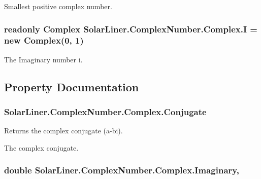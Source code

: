 Smallest positive complex number. 

\subsubsection[{\texorpdfstring{I}{I}}]{\setlength{\rightskip}{0pt plus 5cm}readonly {\bf Complex} Solar\+Liner.\+Complex\+Number.\+Complex.\+I = new {\bf Complex}(0, 1)\hspace{0.3cm}{\ttfamily [static]}}\hypertarget{struct_solar_liner_1_1_complex_number_1_1_complex_acc1fad2ea19dcd2fae4cd17279edb99d}{}\label{struct_solar_liner_1_1_complex_number_1_1_complex_acc1fad2ea19dcd2fae4cd17279edb99d}


The Imaginary number i. 



\subsection{Property Documentation}
\subsubsection[{\texorpdfstring{Conjugate}{Conjugate}}]{ Solar\+Liner.\+Complex\+Number.\+Complex.\+Conjugate\hspace{0.3cm}{\ttfamily [get]}}\hypertarget{struct_solar_liner_1_1_complex_number_1_1_complex_a17a3e752294b9155259c017f85dc029c}{}\label{struct_solar_liner_1_1_complex_number_1_1_complex_a17a3e752294b9155259c017f85dc029c}


Returns the complex conjugate (a-\/bi). 

The complex conjugate.
\subsubsection[{\texorpdfstring{Imaginary}{Imaginary}}]{\setlength{\rightskip}{0pt plus 5cm}double Solar\+Liner.\+Complex\+Number.\+Complex.\+Imaginary\hspace{0.3cm}{\ttfamily [get]}, {\ttfamily [set]}}\hypertarget{struct_solar_liner_1_1_complex_number_1_1_complex_a2298837eb7f6533771873169b38a4067}{}\label{struct_solar_liner_1_1_complex_number_1_1_complex_a2298837eb7f6533771873169b38a4067}


